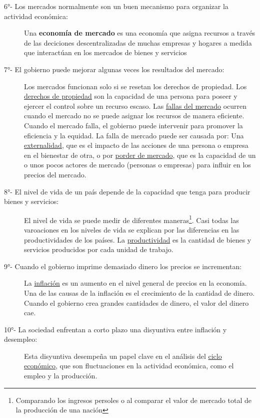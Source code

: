 \begin{description}
  \item [\large 6°- Los mercados normalmente son un buen mecanismo para organizar la actividad económica:] Una {\bf economía de mercado} es una economía que asigna recursos a través de las deciciones descentralizadas de muchas empresas y hogares a medida que interactúan en los mercados de bienes y servicios
  \item [\large 7°- El gobierno puede mejorar algunas veces los resultados del mercado:] Los mercados funcionan solo si se resetan los derechos de propiedad. Los \underline{derechos de propiedad} son la capacidad de una persona para poseer y ejercer el control sobre un recurso escaso. Las \underline{fallas del mercado} ocurren cuando el mercado no se puede asignar los recursos de manera eficiente. Cuando el mercado falla, el gobierno puede intervenir para promover la eficiencia y la equidad. La falla de mercado puede ser causada por: Una \underline{externalidad}, que es el impacto de las acciones de una persona o empresa en el bienestar de otra, o por \underline{porder de mercado}, que es la capacidad de un o unos pocos actores de mercado (personas o empresas) para influir en los precios del mercado.
  \item [\large 8°- El nivel de vida de un país depende de la capacidad que tenga para producir bienes y servicios:] El nivel de vida se puede medir de diferentes maneras\footnote{Comparando los ingresos persoles o al comparar el valor de mercado total de la producción de una nación}. Casi todas las varoaciones en los niveles de vida se explican por las diferencias en las productividades de los países. La \underline{productividad} es la cantidad de bienes y servicios producidos por cada unidad de trabajo.
  \item [\large 9°- Cuando el gobierno imprime demasiado dinero los precios se incrementan:] La \underline{inflación} es un aumento en el nivel general de precios en la economía. Una de las causas de la inflación es el crecimiento de la cantidad de dinero. Cuando el gobierno crea grandes cantidades de dinero, el valor del dinero cae.
  \item [\large 10°- La sociedad enfrentan a corto plazo una disyuntiva entre inflación y desempleo: ] Esta disyuntiva desempeña un papel clave en el análisis del \underline{ciclo económico}, que son fluctuaciones en la actividad económica, como el empleo y la producción.
\end{description}

\newpage
